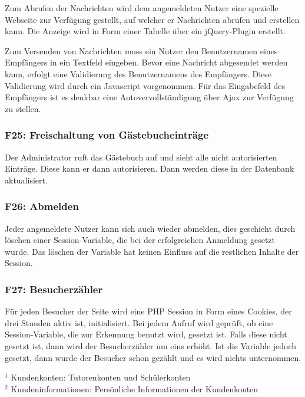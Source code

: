 \documentclass[10pt,a4paper]{scrartcl}
\begin{document}
Zum Abrufen der Nachrichten wird dem angemeldeten Nutzer eine spezielle Webseite zur Verfügung gestellt,
auf welcher er Nachrichten abrufen und erstellen kann. Die Anzeige wird in Form einer Tabelle über
ein jQuery-Plugin erstellt. 

Zum Versenden von Nachrichten muss ein Nutzer den Benutzernamen eines Empfängers in ein Textfeld eingeben.
Bevor eine Nachricht abgesendet werden kann, erfolgt eine Validierung des Benutzernamens des Empfängers.
Diese Validierung wird durch ein Javascript vorgenommen. 
Für das Eingabefeld des Empfängers ist es denkbar eine Autovervollständigung über Ajax zur Verfügung zu stellen. 

\subsubsection*{F25: Freischaltung von Gästebucheinträge}

Der Administrator ruft das Gästebuch auf und sieht alle nicht autorisierten Einträge. Diese kann er dann autorisieren. Dann werden diese in der Datenbank aktualisiert.

\subsubsection*{F26: Abmelden}

Jeder angemeldete Nutzer kann sich auch wieder abmelden, dies geschieht durch löschen einer Session-Variable, die bei der erfolgreichen Anmeldung gesetzt wurde. Das löschen der Variable hat keinen Einfluss auf die restlichen Inhalte der Session.

\subsubsection*{F27: Besucherzähler}

Für jeden Besucher der Seite wird eine PHP Session in Form eines Cookies, der drei Stunden aktiv ist, initialisiert. Bei jedem Aufruf wird geprüft, ob eine Session-Variable, die zur Erkennung benutzt wird, gesetzt ist. Falls diese nicht gesetzt ist, dann wird der Besucherzähler um eins erhöht. Ist die Variable jedoch gesetzt, dann wurde der Besucher schon gezählt und es wird nichts unternommen.

\bigskip

$^1$ Kundenkonten: Tutorenkonten und Schülerkonten\\
$^2$ Kundeninformationen: Persönliche Informationen der Kundenkonten
\end{document}
